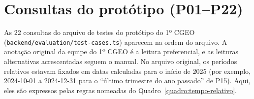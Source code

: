 \newcommand{\dtcase}[4]{%
  \par\medskip\noindent
  {\small
  \begin{tabular}{|p{2.3cm}|p{12cm}|}
  \hline
  \textbf{ID} & \texttt{#1} \\ \hline
  \textbf{Categorias} & #2 \\ \hline
  \textbf{Consulta} & \textit{``#3''} \\ \hline
  \textbf{Leituras aceitas} & \begin{minipage}[t]{12cm}\vspace{0.05cm}\texttt{#4}\vspace{0.1cm}\end{minipage} \\ \hline
  \end{tabular}}
  \par\medskip
}
\newcommand{\dtcasenota}[5]{%
  \par\medskip\noindent
  {\small
  \begin{tabular}{|p{2.3cm}|p{12cm}|}
  \hline
  \textbf{ID} & \texttt{#1} \\ \hline
  \textbf{Categorias} & #2 \\ \hline
  \textbf{Consulta} & \textit{``#3''} \\ \hline
  \textbf{Leituras aceitas} & \begin{minipage}[t]{12cm}\vspace{0.05cm}\texttt{#4}\vspace{0.1cm}\end{minipage} \\ \hline
  \textbf{Nota} & #5 \\ \hline
  \end{tabular}}
  \par\medskip
}



\section{Consultas do protótipo (P01--P22)}
\label{apx:dataset-p}

As 22 consultas do arquivo de testes do protótipo do 1º CGEO (\texttt{backend/\allowbreak evaluation/\allowbreak test-cases.ts}) aparecem na ordem do arquivo. A anotação original da equipe do 1º CGEO é a leitura preferencial, e as leituras alternativas acrescentadas seguem o manual. No arquivo original, os períodos relativos estavam fixados em datas calculadas para o início de 2025 (por exemplo, 2024-10-01 a 2024-12-31 para o ``último trimestre do ano passado'' de P15). Aqui, eles são expressos pelas regras nomeadas do Quadro~\ref{quadro:tempo-relativo}.

